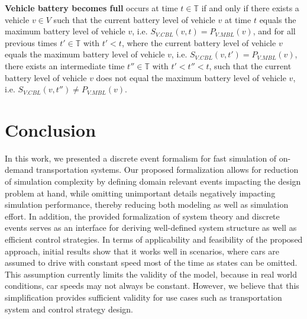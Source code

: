 \documentclass[graybox]{svmult}
\begin{document}
\vspace{2mm}
\noindent \textbf{Vehicle battery becomes full} occurs at time $t \in \mathbb{T}$ if and only if there exists a vehicle $v \in V$ such that the current battery level of vehicle $v$ at time $t$ equals the maximum battery level of vehicle $v$, i.e. $S_{V.CBL}(v,t) = P_{V.MBL}(v)$, and for all previous times $t' \in \mathbb{T}$ with $t' < t$, where the current battery level of vehicle $v$ equals the maximum battery level of vehicle $v$, i.e. $S_{V.CBL}(v,t') = P_{V.MBL}(v)$, there exists an intermediate time $t'' \in \mathbb{T}$ with $t' < t'' < t$, such that the current battery level of vehicle $v$ does not equal the maximum battery level of vehicle $v$, i.e. $S_{V.CBL}(v,t'') \neq P_{V.MBL}(v)$.

\section{Conclusion}
\label{sec:con}

In this work, we presented a discrete event formalism for fast simulation of on-demand transportation systems. Our proposed formalization allows for reduction of simulation complexity by defining domain relevant events impacting the design problem at hand, while omitting unimportant details negatively impacting simulation performance, thereby reducing both modeling as well as simulation effort. In addition, the provided formalization of system theory and discrete events serves as an interface for deriving well-defined system structure as well as efficient control strategies. 
In terms of applicability and feasibility of the proposed approach, initial results show that it works well in scenarios, where cars are assumed to drive with constant speed most of the time as states can be omitted.
This assumption currently limits the validity of the model, because in real world conditions, car speeds may not always be constant.
However, we believe that this simplification provides sufficient validity for use cases such as transportation system and control strategy design.

\newpage


\end{document}
